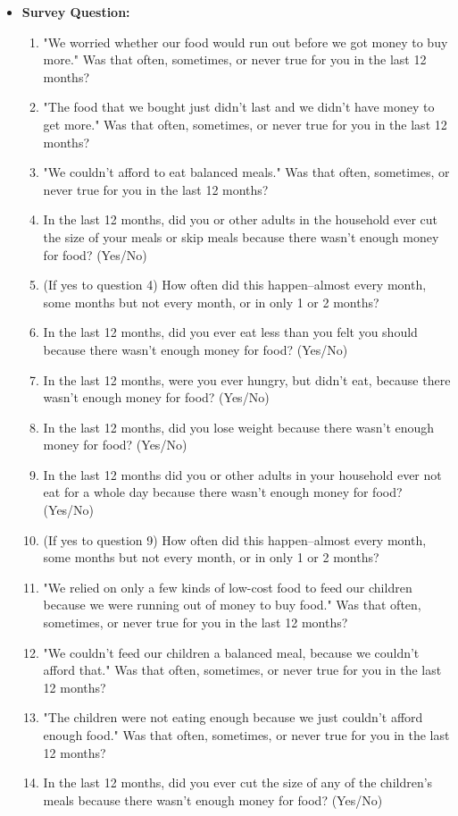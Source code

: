 \documentclass[12pt,letterpaper]{report}
\begin{document}
\begin{itemize}
		\item \textbf{Survey Question:} 
\begin{enumerate}
 \item "We worried whether our food would run out before we got money to buy more." Was that often, sometimes, or never true for you in the last 12 months?
  \item "The food that we bought just didn't last and we didn't have money to get more." Was that often, sometimes, or never true for you in the last 12 months?
  \item "We couldn't afford to eat balanced meals." Was that often, sometimes, or never true for you in the last 12 months?
  \item In the last 12 months, did you or other adults in the household ever cut the size of your meals or skip meals because there wasn't enough money for food? (Yes/No)
  \item (If yes to question 4) How often did this happen--almost every month, some months but not every month, or in only 1 or 2 months?
  \item In the last 12 months, did you ever eat less than you felt you should because there wasn't enough money for food? (Yes/No)
  \item In the last 12 months, were you ever hungry, but didn't eat, because there wasn't enough money for food? (Yes/No)
  \item In the last 12 months, did you lose weight because there wasn't enough money for food? (Yes/No)
  \item In the last 12 months did you or other adults in your household ever not eat for a whole day because there wasn't enough money for food? (Yes/No)
  \item (If yes to question 9) How often did this happen--almost every month, some months but not every month, or in only 1 or 2 months?
  \item "We relied on only a few kinds of low-cost food to feed our children because we were running out of money to buy food." Was that often, sometimes, or never true for you in the last 12 months?
  \item "We couldn't feed our children a balanced meal, because we couldn't afford that." Was that often, sometimes, or never true for you in the last 12 months?
  \item "The children were not eating enough because we just couldn't afford enough food." Was that often, sometimes, or never true for you in the last 12 months?
  \item In the last 12 months, did you ever cut the size of any of the children's meals because there wasn't enough money for food? (Yes/No)

\end{enumerate}
\end{itemize}
\end{document}
